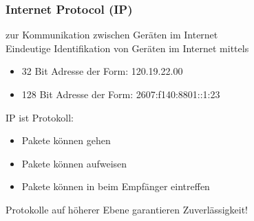\subsubsection*{Internet Protocol (IP)}
 zur Kommunikation zwischen Geräten im Internet\\
Eindeutige Identifikation von Geräten im Internet mittels 
\begin{itemize}
    \item {} 32 Bit Adresse der Form: 120.19.22.00
    \item {} 128 Bit Adresse der Form: 2607:f140:8801::1:23
\end{itemize}
IP ist  Protokoll:
\begin{itemize}
    \item Pakete können  gehen
    \item Pakete können  aufweisen
    \item Pakete können in  beim Empfänger eintreffen
\end{itemize}
Protokolle auf höherer Ebene garantieren Zuverlässigkeit!
